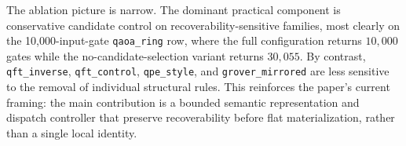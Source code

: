 The ablation picture is narrow. The dominant practical component is
conservative candidate control on recoverability-sensitive families, most
clearly on the 10,000-input-gate \texttt{qaoa\_ring} row, where the full configuration returns
$10{,}000$ gates while the no-candidate-selection variant returns $30{,}055$.
By contrast, \texttt{qft\_inverse}, \texttt{qft\_control},
\texttt{qpe\_style}, and \texttt{grover\_mirrored} are less sensitive to the
removal of individual structural rules. This reinforces the paper's current
framing: the main contribution is a bounded semantic representation and
dispatch controller that preserve recoverability before flat materialization,
rather than a single local identity.
